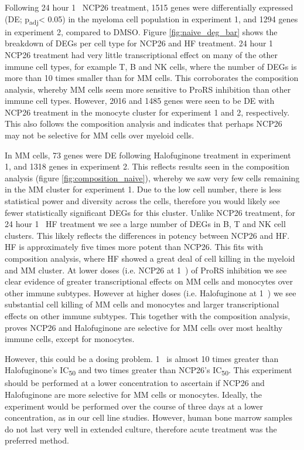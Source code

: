 Following 24 hour 1\si{\micro\Molar} NCP26 treatment, 1515 genes were differentially expressed (DE; p\textsubscript{adj}< 0.05) in the myeloma cell population in experiment 1, and 1294 genes in experiment 2, compared to DMSO\@.
Figure \ref{fig:naive_deg_bar} shows the breakdown of DEGs per cell type for NCP26 and HF treatment.
24 hour 1\si{\micro\Molar} NCP26 treatment had very little transcriptional effect on many of the other immune cell types, for example T, B and NK cells, where the number of DEGs is more than 10 times smaller than for MM cells.
This corroborates the composition analysis, whereby MM cells seem more sensitive to ProRS inhibition than other immune cell types.
However, 2016 and 1485 genes were seen to be DE with NCP26 treatment in the monocyte cluster for experiment 1 and 2, respectively.
This also follows the composition analysis and indicates that perhaps NCP26 may not be selective for MM cells over myeloid cells.

In MM cells, 73 genes were DE following Halofuginone treatment in experiment 1, and 1318 genes in experiment 2.
This reflects results seen in the composition analysis (figure \ref{fig:composition_naive}), whereby we saw very few cells remaining in the MM cluster for experiment 1.
Due to the low cell number, there is less statistical power and diversity across the cells, therefore you would likely see fewer statistically significant DEGs for this cluster.
Unlike NCP26 treatment, for 24 hour 1\si{\micro\Molar} HF treatment we see a large number of DEGs in B, T and NK cell clusters.
This likely reflects the differences in potency between NCP26 and HF\@.
HF is approximately five times more potent than NCP26.
This fits with composition analysis, where HF showed a great deal of cell killing in the myeloid and MM cluster.
At lower doses (i.e. NCP26 at 1\si{\micro\Molar}) of ProRS inhibition we see clear evidence of greater transcriptional effects on MM cells and monocytes over other immune subtypes.
However at higher doses (i.e. Halofuginone at 1\si{\micro\Molar}) we see substantial cell killing of MM cells and monocytes and larger transcriptional effects on other immune subtypes.
This together with the composition analysis, proves NCP26 and Halofuginone are selective for MM cells over most healthy immune cells, except for monocytes.

However, this could be a dosing problem.
1\si{\micro\Molar} is almost 10 times greater than Halofuginone's IC\textsubscript{50} and two times greater than NCP26's IC\textsubscript{50}.
This experiment should be performed at a lower concentration to ascertain if NCP26 and Halofuginone are more selective for MM cells or monocytes.
Ideally, the experiment would be performed over the course of three days at a lower concentration, as in our cell line studies.
However, human bone marrow samples do not last very well in extended culture, therefore acute treatment was the preferred method.


